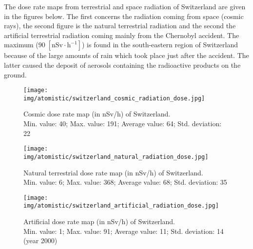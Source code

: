 	The dose rate maps from terrestrial and space radiation of Switzerland are given in the figures below. The first concerns the radiation coming from space (cosmic rays), the second figure is the natural terrestrial radiation and the second the artificial terrestrial radiation coming mainly from the Chernobyl accident. The maximum ($90\;[\text{nSv}\cdot\text{h}^{-1}]$) is found in the south-eastern region of Switzerland because of the large amounts of rain which took place just after the accident. The latter caused the deposit of aerosols containing the radioactive products on the ground.
	
	\begin{figure}[H]
		\centering
		\texttt{[image: img/atomistic/switzerland\_cosmic\_radiation\_dose.jpg]}
		\caption[]{Cosmic dose rate map (in nSv/h) of Switzerland.\\ Min. value: 40; Max. value: 191; Average value: 64; Std. deviation: 22}
	\end{figure}
	
	\begin{figure}[H]
		\centering
		\texttt{[image: img/atomistic/switzerland\_natural\_radiation\_dose.jpg]}
		\caption[]{Natural terrestrial dose rate map (in nSv/h) of Switzerland.\\ Min. value: 6; Max. value: 368; Average value: 68; Std. deviation: 35}
	\end{figure}
	
	\begin{figure}[H]
		\centering
		\texttt{[image: img/atomistic/switzerland\_artificial\_radiation\_dose.jpg]}
		\caption[]{Artificial dose rate map (in nSv/h) of Switzerland.\\ Min. value: 1; Max. value: 91; Average value: 11; Std. deviation: 14 (year 2000)}
	\end{figure}
	
